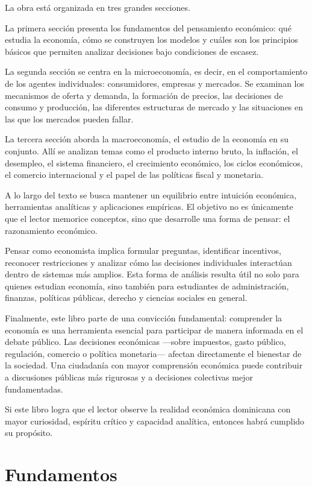 \documentclass[
  letterpaper,
  DIV=11,
  numbers=noendperiod,
  oneside]{scrreprt}
\begin{document}
La obra está organizada en tres grandes secciones.

La primera sección presenta los fundamentos del pensamiento económico:
qué estudia la economía, cómo se construyen los modelos y cuáles son los
principios básicos que permiten analizar decisiones bajo condiciones de
escasez.

La segunda sección se centra en la microeconomía, es decir, en el
comportamiento de los agentes individuales: consumidores, empresas y
mercados. Se examinan los mecanismos de oferta y demanda, la formación
de precios, las decisiones de consumo y producción, las diferentes
estructuras de mercado y las situaciones en las que los mercados pueden
fallar.

La tercera sección aborda la macroeconomía, el estudio de la economía en
su conjunto. Allí se analizan temas como el producto interno bruto, la
inflación, el desempleo, el sistema financiero, el crecimiento
económico, los ciclos económicos, el comercio internacional y el papel
de las políticas fiscal y monetaria.

A lo largo del texto se busca mantener un equilibrio entre intuición
económica, herramientas analíticas y aplicaciones empíricas. El objetivo
no es únicamente que el lector memorice conceptos, sino que desarrolle
una forma de pensar: el razonamiento económico.

Pensar como economista implica formular preguntas, identificar
incentivos, reconocer restricciones y analizar cómo las decisiones
individuales interactúan dentro de sistemas más amplios. Esta forma de
análisis resulta útil no solo para quienes estudian economía, sino
también para estudiantes de administración, finanzas, políticas
públicas, derecho y ciencias sociales en general.

Finalmente, este libro parte de una convicción fundamental: comprender
la economía es una herramienta esencial para participar de manera
informada en el debate público. Las decisiones económicas ---sobre
impuestos, gasto público, regulación, comercio o política monetaria---
afectan directamente el bienestar de la sociedad. Una ciudadanía con
mayor comprensión económica puede contribuir a discusiones públicas más
rigurosas y a decisiones colectivas mejor fundamentadas.

Si este libro logra que el lector observe la realidad económica
dominicana con mayor curiosidad, espíritu crítico y capacidad analítica,
entonces habrá cumplido su propósito.

\part{Fundamentos}
\end{document}
